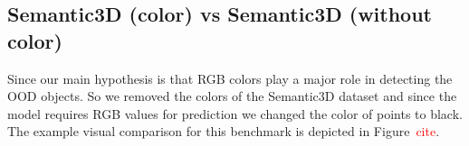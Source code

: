 \subsection{Semantic3D (color) vs Semantic3D (without color)}
Since our main hypothesis is that RGB colors play a major role in detecting the OOD objects.
So we removed the colors of the Semantic3D dataset and since the model requires RGB values for prediction we changed the color of points to black.
The example visual comparison for this benchmark is depicted in Figure~\textcolor{red}{cite}.
